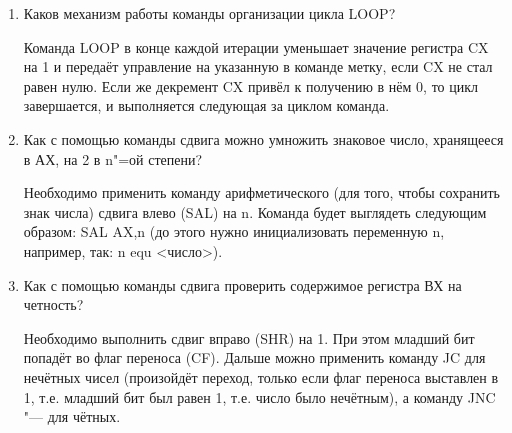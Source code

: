 \documentclass[bachelor, och, otchet]{SCWorks}
\begin{document}
\begin{enumerate}
\small
\inputminted{nasm}{example.asm}
\normalsize

\item Каков механизм работы команды организации цикла LOOP?

Команда LOOP в конце каждой итерации уменьшает значение регистра CX на 1 и передаёт управление на указанную в команде метку, если CX не стал равен нулю. Если же декремент CX привёл к получению в нём 0, то цикл завершается, и выполняется следующая за циклом команда.

\item Как с помощью команды сдвига можно умножить знаковое число, хранящееся в АХ, на 2 в n"=ой степени? 

Необходимо применить команду арифметического (для того, чтобы сохранить знак числа) сдвига влево (SAL) на n. Команда будет выглядеть следующим образом: SAL AX,n (до этого нужно инициализовать переменную n, например, так: n equ <число>).

\item Как с помощью команды сдвига проверить содержимое регистра ВХ на четность?

Необходимо выполнить сдвиг вправо (SHR) на 1. При этом младший бит попадёт во флаг переноса (CF). Дальше можно применить команду JC для нечётных чисел (произойдёт переход, только если флаг переноса выставлен в 1, т.е. младший бит был равен 1, т.е. число было нечётным), а команду JNC "--- для чётных.

\end{enumerate}

\appendix
\end{document}
